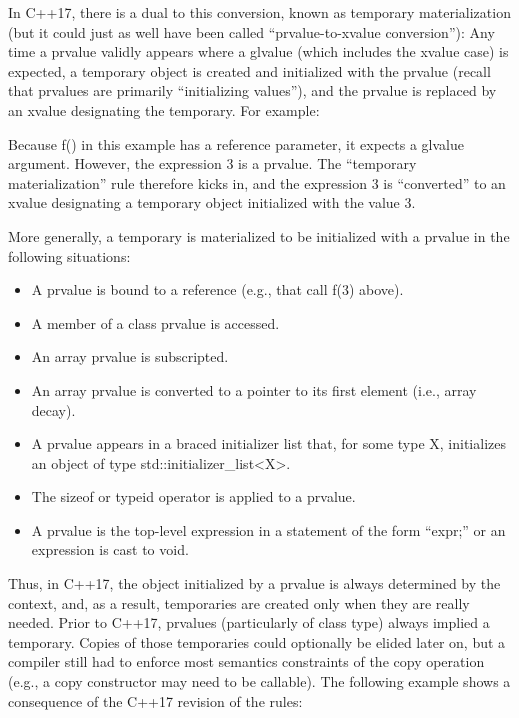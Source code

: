 In C++17, there is a dual to this conversion, known as temporary materialization (but it could just as well have been called “prvalue-to-xvalue conversion”): Any time a prvalue validly appears where a glvalue (which includes the xvalue case) is expected, a temporary object is created and initialized with the prvalue (recall that prvalues are primarily “initializing values”), and the prvalue is replaced by an xvalue designating the temporary. For example:

Because f() in this example has a reference parameter, it expects a glvalue argument. However, the expression 3 is a prvalue. The “temporary materialization” rule therefore kicks in, and the expression 3 is “converted” to an xvalue designating a temporary object initialized with the value 3.

More generally, a temporary is materialized to be initialized with a prvalue in the following situations:

\begin{itemize}
\item 
A prvalue is bound to a reference (e.g., that call f(3) above).

\item 
A member of a class prvalue is accessed.

\item 
An array prvalue is subscripted.

\item 
An array prvalue is converted to a pointer to its first element (i.e., array decay).

\item 
A prvalue appears in a braced initializer list that, for some type X, initializes an object of type std::initializer\_list<X>.

\item 
The sizeof or typeid operator is applied to a prvalue.

\item 
A prvalue is the top-level expression in a statement of the form “expr;” or an expression is cast to void.
\end{itemize}

Thus, in C++17, the object initialized by a prvalue is always determined by the context, and, as a result, temporaries are created only when they are really needed. Prior to C++17, prvalues (particularly of class type) always implied a temporary. Copies of those temporaries could optionally be elided later on, but a compiler still had to enforce most semantics constraints of the copy operation (e.g., a copy constructor may need to be callable). The following example shows a consequence of the C++17 revision of the rules:

